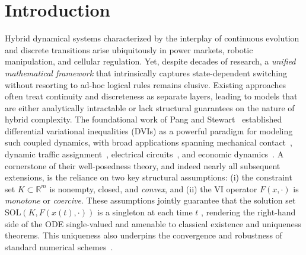 \documentclass[sn-basic,Numbered]{sn-jnl}
\theoremstyle{thmstyleone}%
\begin{document}


\maketitle

\section{Introduction}\label{sec:introduction}
Hybrid dynamical systems characterized by the interplay of continuous evolution and discrete transitions arise ubiquitously in power markets, robotic manipulation, and cellular regulation. Yet, despite decades of research, a \emph{unified mathematical framework} that intrinsically captures state-dependent switching without resorting to ad-hoc logical rules remains elusive. Existing approaches often treat continuity and discreteness as separate layers, leading to models that are either analytically intractable or lack structural guarantees on the nature of hybrid complexity.
The foundational work of Pang and Stewart~\cite{Pang2008} established differential variational inequalities (DVIs) as a powerful paradigm for modeling such coupled dynamics, with broad applications spanning mechanical contact~\cite{Stewart2008}, dynamic traffic assignment~\cite{Friesz2010}, electrical circuits~\cite{Acary2008}, and economic dynamics~\cite{Li2010}. A cornerstone of their well-posedness theory, and indeed nearly all subsequent extensions, is the reliance on two key structural assumptions: (i) the constraint set $ K \subset \mathbb{R}^m $ is nonempty, closed, and \emph{convex}, and (ii) the VI operator $ F(x,\cdot) $ is \emph{monotone} or \emph{coercive}. These assumptions jointly guarantee that the solution set $ \mathrm{SOL}(K, F(x(t),\cdot)) $ is a singleton at each time $ t $ , rendering the right-hand side of the ODE single-valued and amenable to classical existence and uniqueness theorems. This uniqueness also underpins the convergence and robustness of standard numerical schemes~\cite{Chen2013,Han2010,Zhang2023,Zhang2023penalty,Huang2026}.
\end{document}
